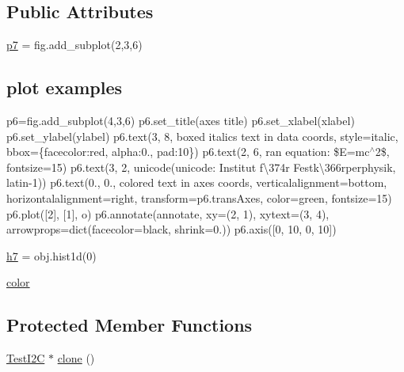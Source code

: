 \subsection*{Public Attributes}
\begin{DoxyCompactItemize}
\item 
\hyperlink{classTestI2C_a997a17364d4aa4e3bbd30f306644b076}{p7} = fig.\+add\+\_\+subplot(2,3,6)
\begin{DoxyCompactList}\small\item\em \subsection*{plot examples}

p6=fig.\+add\+\_\+subplot(4,3,6) p6.\+set\+\_\+title(\textquotesingle{}axes title\textquotesingle{}) p6.\+set\+\_\+xlabel(\textquotesingle{}xlabel\textquotesingle{}) p6.\+set\+\_\+ylabel(\textquotesingle{}ylabel\textquotesingle{}) p6.\+text(3, 8, \textquotesingle{}boxed italics text in data coords\textquotesingle{}, style=\textquotesingle{}italic\textquotesingle{}, bbox=\{\textquotesingle{}facecolor\textquotesingle{}\+:\textquotesingle{}red\textquotesingle{}, \textquotesingle{}alpha\textquotesingle{}\+:0., \textquotesingle{}pad\textquotesingle{}\+:10\}) p6.\+text(2, 6, r\textquotesingle{}an equation\+: \$E=mc$^\wedge$2\$\textquotesingle{}, fontsize=15) p6.\+text(3, 2, unicode(\textquotesingle{}unicode\+: Institut f\textbackslash{}374r Festk\textbackslash{}366rperphysik\textquotesingle{}, \textquotesingle{}latin-\/1\textquotesingle{})) p6.\+text(0., 0., \textquotesingle{}colored text in axes coords\textquotesingle{}, verticalalignment=\textquotesingle{}bottom\textquotesingle{}, horizontalalignment=\textquotesingle{}right\textquotesingle{}, transform=p6.\+trans\+Axes, color=\textquotesingle{}green\textquotesingle{}, fontsize=15) p6.\+plot(\mbox{[}2\mbox{]}, \mbox{[}1\mbox{]}, \textquotesingle{}o\textquotesingle{}) p6.\+annotate(\textquotesingle{}annotate\textquotesingle{}, xy=(2, 1), xytext=(3, 4), arrowprops=dict(facecolor=\textquotesingle{}black\textquotesingle{}, shrink=0.)) p6.\+axis(\mbox{[}0, 10, 0, 10\mbox{]}) \end{DoxyCompactList}\item 
\hyperlink{classTestI2C_a5810c36ed7c1f23edaf77264084b005f}{h7} = obj.\+hist1d(0)
\item 
\hyperlink{classTestI2C_ad56430c679e365a4b3c7e313119937ae}{color}
\end{DoxyCompactItemize}
\subsection*{Protected Member Functions}
\begin{DoxyCompactItemize}
\item 
\hyperlink{classTestI2C_1_1TestI2C}{Test\+I2C} $\ast$ \hyperlink{classTestI2C_a52b8f5f8203ebea02d0cd73be029de23}{clone} ()
\end{DoxyCompactItemize}
